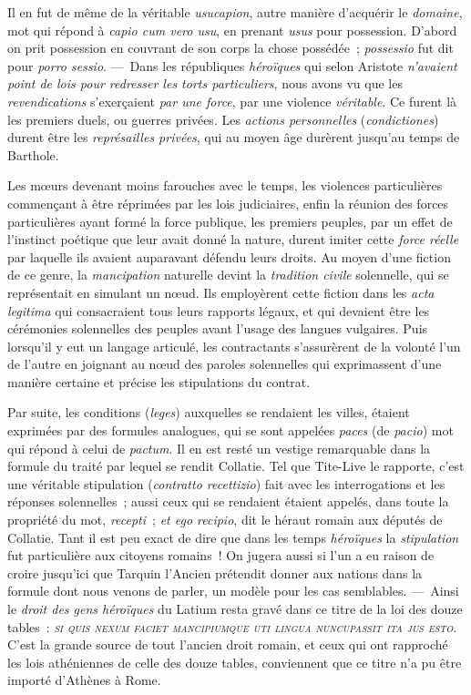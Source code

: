 \documentclass[french,twoside]{book} %
\begin{document}
Il en fut de même de la véritable {\itshape usucapion}, autre manière d’acquérir le {\itshape domaine}, mot qui répond à {\itshape capio cum vero usu}, en prenant {\itshape usus} pour possession. D’abord on prit possession en couvrant de son corps la chose possédée ; {\itshape possessio} fut dit pour {\itshape porro sessio}. — Dans les républiques {\itshape héroïques} qui selon Aristote  \emph{{\itshape n’avaient point de lois pour redresser les torts particuliers}}, nous avons vu que les {\itshape revendications} s’exerçaient {\itshape par une force}, par une violence {\itshape véritable}. Ce furent là les premiers duels, ou guerres privées. Les {\itshape actions personnelles} ({\itshape condictiones}) durent être les {\itshape représailles privées}, qui au moyen âge durèrent jusqu’au temps de Barthole.\par
Les mœurs devenant moins farouches avec le temps, les violences particulières commençant à être réprimées par les lois judiciaires, enfin la réunion des forces particulières ayant formé la force publique, les premiers peuples, par un effet de l’instinct poétique que leur avait donné la nature, durent imiter cette {\itshape force réelle} par laquelle ils avaient auparavant défendu leurs droits. Au moyen d’une fiction de ce genre, la {\itshape mancipation} naturelle devint la {\itshape tradition civile} solennelle, qui se représentait en simulant un nœud. Ils employèrent cette fiction dans les {\itshape acta legitima} qui consacraient tous leurs rapports légaux, et qui devaient être les cérémonies solennelles des peuples avant l’usage des langues vulgaires. Puis lorsqu’il y eut un langage articulé, les contractants s’assurèrent de la volonté l’un de l’autre en joignant au nœud des paroles solennelles qui exprimassent d’une manière certaine et précise les stipulations du contrat.\par
Par suite, les conditions ({\itshape leges}) auxquelles se rendaient les villes, étaient exprimées par des formules analogues, qui se sont appelées {\itshape paces} (de {\itshape pacio}) mot qui répond à celui de {\itshape pactum}. Il en est resté un vestige  remarquable dans la formule du traité par lequel se rendit Collatie. Tel que Tite-Live le rapporte, c’est une véritable stipulation ({\itshape contratto recettizio}) fait avec les interrogations et les réponses solennelles ; aussi ceux qui se rendaient étaient appelés, dans toute la propriété du mot, {\itshape recepti} ; {\itshape et ego recipio}, dit le héraut romain aux députés de Collatie. Tant il est peu exact de dire que dans les temps {\itshape héroïques} la {\itshape stipulation} fut particulière aux citoyens romains ! On jugera aussi si l’un a eu raison de croire jusqu’ici que Tarquin l’Ancien prétendit donner aux nations dans la formule dont nous venons de parler, un modèle pour les cas semblables. — Ainsi le {\itshape droit des gens héroïques} du Latium resta gravé dans ce titre de la loi des douze tables : \emph{{\scshape si quis nexum faciet mancipiumque uti lingua nuncupassit ita jus esto}}. C’est la grande source de tout l’ancien droit romain, et ceux qui ont rapproché les lois athéniennes de celle des douze tables, conviennent que ce titre n’a pu être importé d’Athènes à Rome.\par
\end{document}
